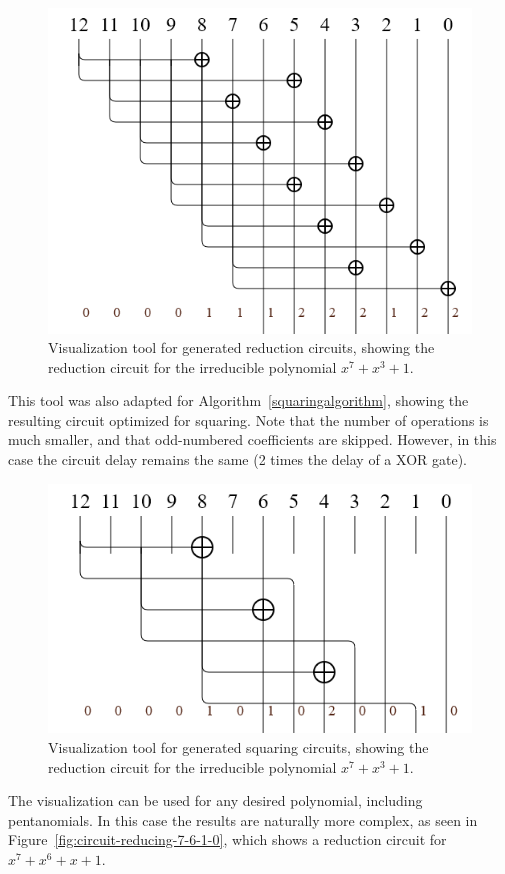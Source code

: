 \begin{figure}
  \caption{Visualization tool for generated reduction circuits, showing the reduction circuit for the irreducible polynomial $x^7 + x^3 + 1$.}
  \label{fig:circuit-reducing-7-3-0}
  \centering
  \includegraphics[width = .8\columnwidth]{figures/reducing-7-3-0.png}
\end{figure}

This tool was also adapted for Algorithm~\ref{squaringalgorithm}, showing the resulting circuit optimized for squaring. Note that the number of operations is much smaller, and that odd-numbered coefficients are skipped. However, in this case the circuit delay remains the same (2 times the delay of a XOR gate).

\begin{figure}
  \caption{Visualization tool for generated squaring circuits, showing the reduction circuit for the irreducible polynomial $x^7 + x^3 + 1$.}
  \label{fig:circuit-squaring-7-3-0}
  \centering
  \includegraphics[width = .8\columnwidth]{figures/squaring-7-3-0.png}
\end{figure}

The visualization can be used for any desired polynomial, including pentanomials. In this case the results are naturally more complex, as seen in Figure~\ref{fig:circuit-reducing-7-6-1-0}, which shows a reduction circuit for $x^7 + x^6 + x + 1$.

